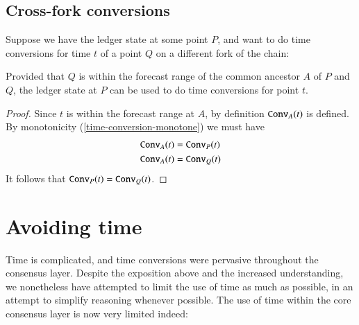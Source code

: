 \subsection{Cross-fork conversions}
\label{time:cross-fork}

\begin{lemma}
Suppose we have the ledger state at some point $P$, and want to do time
conversions for time $t$ of a point $Q$ on a different fork of the chain:

\begin{center}
\end{center}

Provided that $Q$ is within the forecast range of the common ancestor $A$
of $P$ and $Q$, the ledger state at $P$ can be used to do time conversions
for point $t$.
\end{lemma}

\begin{proof}
Since $t$ is within the forecast range at $A$, by definition $\mathtt{Conv}_{A}(t)$
is defined. By monotonicity (\cref{time-conversion-monotone}) we must have
\begin{align*}
\mathtt{Conv}_{A}(t) & = \mathtt{Conv}_{P}(t) \\
\mathtt{Conv}_{A}(t) & = \mathtt{Conv}_{Q}(t)
\end{align*}
It follows that $\mathtt{Conv}_{P}(t) = \mathtt{Conv}_{Q}(t)$.
\end{proof}

\section{Avoiding time}
\label{hfc:avoiding-time}

Time is complicated, and time conversions were pervasive throughout the
consensus layer. Despite the exposition above and the increased understanding,
we nonetheless have attempted to limit the use of time as much as possible,
in an attempt to simplify reasoning whenever possible. The use of
time within the core consensus layer is now very limited indeed:


